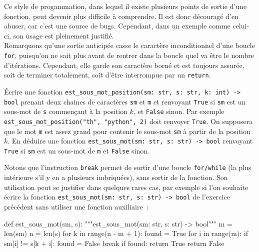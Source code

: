 \documentclass{magnolia}
\begin{document}
\noindent
Ce style de progammation, dans lequel il existe plusieurs points de sortie d'une fonction,
peut devenir plus difficile à comprendre. Il est donc découragé d'en abuser,
car c'est une source de bugs. Cependant, dans un exemple comme celui-ci, son usage est pleinement justifié.\\

Remarquons qu'une sortie anticipée casse le caractère inconditionnel d'une boucle \verb!for!, puisqu'on
ne sait plus avant de rentrer dans la boucle quel va être le nombre d'itérations. Cependant, elle
garde son caractère borné et est toujours assurée, soit de terminer totalement, soit
d'être interrompue par un \verb!return!.
\vspace{2ex}
\begin{exoUnique}
\exo
  \begin{questions}
  \question Écrire une fonction \verb!est_sous_mot_position(sm: str, s: str, k: int) -> bool! 
    prenant deux chaines de caractères \verb_sm_ et \verb_m_ et renvoyant \verb!True! si
    \verb!sm! est un sous-mot de \verb!s! commençant à la position $k$, et \verb!False! sinon.
    Par exemple \verb!est_sous_mot_position("th", "python", 2)! doit renvoyer \verb!True!.
    On supposera que le mot \verb!m! est assez grand pour contenir le sous-mot \verb!sm! à
    partir de la position $k$.
  \question En déduire une fonction \verb!est_sous_mot(sm: str, s: str) -> bool! renvoyant
    \verb!True! si \verb!sm! est un sous-mot de \verb!m! et \verb!False! sinon.
  \end{questions}
\end{exoUnique}
\vspace{2ex}
Notons que l'instruction \verb_break_ permet de sortir d'une boucle \verb!for/while!
(la plus intérieure s'il y en a plusieurs imbriquées), sans sortir de la fonction.
Son utilisation peut se justifier dans quelques rares cas,
par exemple si l'on souhaite écrire la fonction \verb!est_sous_mot(sm: str, s: str) -> bool! de
l'exercice précédent sans utiliser une fonction auxiliaire~:

\begin{pythoncodeline}
def est_sous_mot(sm, s):
    """est_sous_mot(sm: str, s: str) -> bool"""
    m = len(sm)
    n = len(s)
    for k in range(n - m + 1):
        found = True
        for i in range(m):
            if sm[i] != s[k + i]:
                found = False
                break
        if found:
            return True
    return False    
\end{pythoncodeline}
\end{document}
